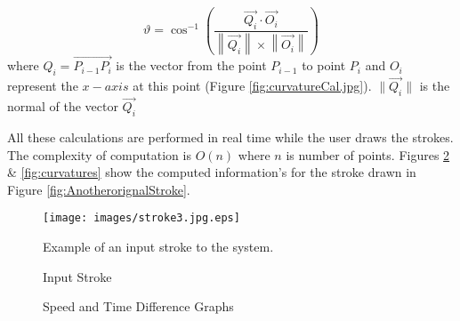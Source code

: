  \begin{equation}
\label{eq:direction}
	\vartheta  = \cos ^{ - 1} \left( {\frac{{\overrightarrow {Q_i}  \cdot \overrightarrow {O_i } }}{{\left\| {\overrightarrow {Q_i} } \right\| \times \left\| {\overrightarrow {O_i} } \right\|}}} \right)
\end{equation}
where $Q_i=\overrightarrow {P_{i - 1} P_i }$ is the vector from the point  $P_{i - 1}$ to point $P_i$ and $O_i$ represent the $x-axis$ at this point (Figure \ref{fig:curvatureCal.jpg}).  $\|{\overrightarrow {Q_i }}\|$ is the normal of the  vector $\overrightarrow{Q_i}$
 
 
 
 All these calculations are performed in real time while the user draws the strokes. The complexity of computation is $O(n)$ where $n$ is number of points. Figures \ref{fig:speed2Distance} \&  \ref{fig:curvatures} show the computed information's for the stroke drawn in Figure \ref{fig:AnotherorignalStroke}.%

\begin{figure}[]
	\centering
		\texttt{[image: images/stroke3.jpg.eps]}
	\caption{Input Stroke} Example of an input stroke to the system. 
	\label{fig:orignalStroke}
\end{figure}


\begin{figure}
	\centering
			\hfill
	\caption{Speed and Time Difference Graphs}
	\label{fig:speed2Distance}
\end{figure}

